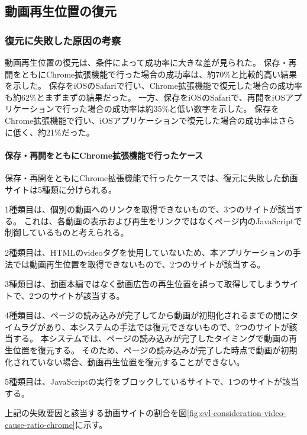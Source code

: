 \subsection{動画再生位置の復元}
\subsubsection{復元に失敗した原因の考察}

動画再生位置の復元は、条件によって成功率に大きな差が見られた。
保存・再開をともにChrome拡張機能で行った場合の成功率は、約70\%と比較的高い結果を示した。
保存をiOSのSafariで行い、Chrome拡張機能で復元した場合の成功率も約62\%とまずまずの結果だった。
一方、保存をiOSのSafariで、再開をiOSアプリケーションで行った場合の成功率は約35\%と低い数字を示した。
保存をChrome拡張機能で行い、iOSアプリケーションで復元した場合の成功率はさらに低く、約21\%だった。

\paragraph{保存・再開をともにChrome拡張機能で行ったケース}

保存・再開をともにChrome拡張機能で行ったケースでは、復元に失敗した動画サイトは5種類に分けられる。

1種類目は、個別の動画へのリンクを取得できないもので、3つのサイトが該当する。
これは、各動画の表示および再生をリンクではなくページ内のJavaScriptで制御しているものと考えられる。

2種類目は、HTMLのvideoタグを使用していないため、本アプリケーションの手法では動画再生位置を取得できないもので、2つのサイトが該当する。

3種類目は、動画本編ではなく動画広告の再生位置を誤って取得してしまうサイトで、2つのサイトが該当する。

4種類目は、ページの読み込みが完了してから動画が初期化されるまでの間にタイムラグがあり、本システムの手法では復元できないもので、2つのサイトが該当する。
本システムでは、ページの読み込みが完了したタイミングで動画の再生位置を復元する。
そのため、ページの読み込みが完了した時点で動画が初期化されていない場合、動画再生位置を復元することができない。

5種類目は、JavaScriptの実行をブロックしているサイトで、1つのサイトが該当する。

上記の失敗要因と該当する動画サイトの割合を図\ref{fig:evl-consideration-video-cause-ratio-chrome}に示す。

